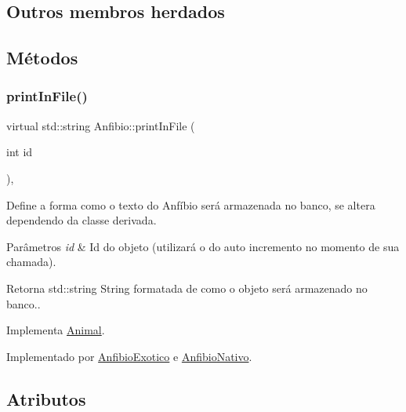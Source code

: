 \subsection*{Outros membros herdados}


\subsection{Métodos}
\mbox{\label{classAnfibio_ab866ca21fb00c2d4d571aadd271eadec}} 
\subsubsection{\texorpdfstring{print\+In\+File()}{printInFile()}}
{\footnotesize\ttfamily virtual std\+::string Anfibio\+::print\+In\+File (\begin{DoxyParamCaption}\item[{int}]{id }\end{DoxyParamCaption})\hspace{0.3cm}{\ttfamily [protected]}, {}}



Define a forma como o texto do Anfíbio será armazenada no banco, se altera dependendo da classe derivada. 


\begin{DoxyParams}{Parâmetros}
{\em id} & Id do objeto (utilizará o do auto incremento no momento de sua chamada). \\
\hline
\end{DoxyParams}
\begin{DoxyReturn}{Retorna}
std\+::string String formatada de como o objeto será armazenado no banco.. 
\end{DoxyReturn}


Implementa \hyperlink{classAnimal_ac75406040726a6339932d70164cc7242}{Animal}.



Implementado por \hyperlink{classAnfibioExotico_a08d9debec54258a0f43c8c503dfb23d0}{Anfibio\+Exotico} e \hyperlink{classAnfibioNativo_a7926e1af44542ee268e27dd3d862f583}{Anfibio\+Nativo}.



\subsection{Atributos}
\mbox{\label{classAnfibio_a994200134b0d314e3db0ac5c781bb7e7}} 
